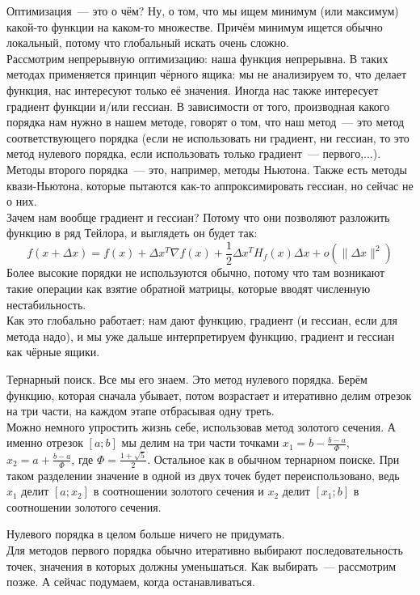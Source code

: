 \documentclass{article}
\begin{document}
    \noindent Оптимизация~--- это о чём? Ну, о том, что мы ищем минимум (или максимум) какой-то функции на каком-то множестве. Причём минимум ищется обычно локальный, потому что глобальный искать очень сложно.\\
    Рассмотрим непрерывную оптимизацию: наша функция непрерывна. В таких методах применяется принцип чёрного ящика: мы не анализируем то, что делает функция, нас интересуют только её значения. Иногда нас также интересует градиент функции и/или гессиан. В зависимости от того, производная какого порядка нам нужно в нашем методе, говорят о том, что наш метод~--- это метод соответствующего порядка (если не использовать ни градиент, ни гессиан, то это метод нулевого порядка, если использовать только градиент~--- первого,...). Методы второго порядка~--- это, например, методы Ньютона. Также есть методы квази-Ньютона, которые пытаются как-то аппроксимировать гессиан, но сейчас не о них.\\
    Зачем нам вообще градиент и гессиан? Потому что они позволяют разложить функцию в ряд Тейлора, и выглядеть он будет так:
    \[
    f(x+\Delta x)=f(x)+\Delta x^T\nabla f(x)+\frac12\Delta x^TH_f(x)\Delta x+o(\|\Delta x\|^2)
    \]
    Более высокие порядки не используются обычно, потому что там возникают такие операции как взятие обратной матрицы, которые вводят численную нестабильность.\\
    Как это глобально работает: нам дают функцию, градиент (и гессиан, если для метода надо), и мы уже дальше интерпретируем функцию, градиент и гессиан как чёрные ящики.
    \begin{example}
        Тернарный поиск. Все мы его знаем. Это метод нулевого порядка. Берём функцию, которая сначала убывает, потом возрастает и итеративно делим отрезок на три части, на каждом этапе отбрасывая одну треть.\\
        Можно немного упростить жизнь себе, использовав метод золотого сечения. А именно отрезок $[a;b]$ мы делим на три части точками $x_1=b-\frac{b-a}\Phi$, $x_2=a+\frac{b-a}\Phi$, где $\Phi=\frac{1+\sqrt5}2$. Остальное как в обычном тернарном поиске. При таком разделении значение в одной из двух точек будет переиспользовано, ведь $x_1$ делит $[a;x_2]$ в соотношении золотого сечения и $x_2$ делит $[x_1;b]$ в соотношении золотого сечения.
    \end{example}\noindent
    Нулевого порядка в целом больше ничего не придумать.\\
    Для методов первого порядка обычно итеративно выбирают последовательность точек, значения в которых должны уменьшаться. Как выбирать~--- рассмотрим позже. А сейчас подумаем, когда останавливаться.
\end{document}

